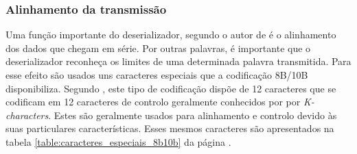 \subsubsection*{Alinhamento da transmissão}
Uma função importante do deserializador, segundo o autor de \cite{R032} é o alinhamento dos dados que chegam em série. Por outras palavras, é importante que o deserializador reconheça os limites de uma determinada palavra transmitida. Para esse efeito são usados uns caracteres especiais que a codificação 8B/10B disponibiliza. Segundo \cite{R032}, este tipo de codificação dispõe de 12 caracteres que se codificam em 12 caracteres de controlo geralmente conhecidos por por \textit{K-characters}. Estes são geralmente usados para alinhamento e controlo devido às suas particulares características. Esses mesmos caracteres são apresentados na tabela \ref{table:caracteres_especiais_8b10b} da página \pageref{table:caracteres_especiais_8b10b}.

